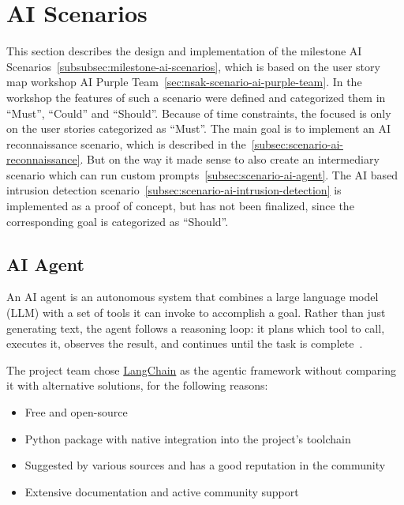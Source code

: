 \section{AI Scenarios}\label{sec:ai-scenarios-implementation}

This section describes the design and implementation of the milestone \gls{AI} Scenarios~\ref{subsubsec:milestone-ai-scenarios},
which is based on the user story map workshop \gls{AI} Purple Team~\ref{sec:nsak-scenario-ai-purple-team}.
In the workshop the features of such a scenario were defined and categorized them in \enquote{Must}, \enquote{Could} and \enquote{Should}.
Because of time constraints, the focused is only on the user stories categorized as \enquote{Must}.
The main goal is to implement an \gls{AI} reconnaissance scenario, which is described in the~\ref{subsec:scenario-ai-reconnaissance}.
But on the way it made sense to also create an intermediary scenario which can run custom prompts~\ref{subsec:scenario-ai-agent}.
The \gls{AI} based intrusion detection scenario~\ref{subsec:scenario-ai-intrusion-detection} is implemented as a proof of concept,
but has not been finalized, since the corresponding goal is categorized as \enquote{Should}.

\subsection{\gls{AI} Agent}\label{subsec:ai-scenarios-implementation-ai-agent}

An \gls{AI} agent is an autonomous system that combines a large language model (\gls{LLM}) with a set of tools it can invoke to accomplish a goal.
Rather than just generating text, the agent follows a reasoning loop: it plans which tool to call, executes it,
observes the result, and continues until the task is complete~\cite{the-rise-of-agentic-ai}.

The project team chose \href{https://www.langchain.com/}{LangChain} as the agentic framework without comparing it with alternative solutions, for the following reasons:

\begin{itemize}
    \item Free and open-source
    \item Python package with native integration into the project's toolchain
    \item Suggested by various sources and has a good reputation in the community
    \item Extensive documentation and active community support
\end{itemize}

